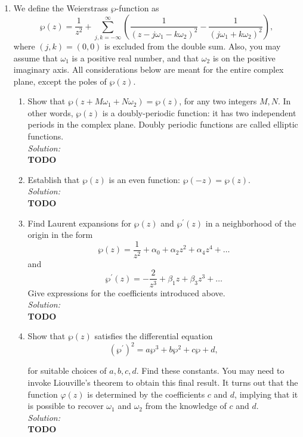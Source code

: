 \documentclass[10pt]{amsart}
\theoremstyle{nonumberplain}
\begin{document}
\begin{enumerate}[label={\bf {\arabic*}:}]
\item We define the Weierstrass $\wp$-function as
$$
\wp(z)=\frac{1}{z^2}+\sum_{j, k=-\infty}^{\infty}\left(\frac{1}{\left(z-j \omega_1-k \omega_2\right)^2}-\frac{1}{\left(j \omega_1+k \omega_2\right)^2}\right),
$$
where $(j, k)=(0,0)$ is excluded from the double sum. Also, you may
assume that $\omega_1$ is a positive real number, and that $\omega_2$
is on the positive imaginary axis. All considerations below are meant
for the entire complex plane, except the poles of $\wp(z)$.
\begin{enumerate}
\item Show that $\wp\left(z+M \omega_1+N \omega_2\right)=\wp(z)$, for any two integers $M, N$. In other words, $\wp(z)$ is a doubly-periodic function: it has two independent periods in the complex plane. Doubly periodic functions are called elliptic functions. \\
\textit{Solution:} \\
\textbf{TODO} \\

\item Establish that $\wp(z)$ is an even function: $\wp(-z)=\wp(z)$. \\
\textit{Solution:} \\
\textbf{TODO} \\

\item Find Laurent expansions for $\wp(z)$ and $\wp^{\prime}(z)$ in a neighborhood of the origin in the form
$$ \wp(z)=\frac{1}{z^2}+\alpha_0+\alpha_2 z^2+\alpha_4 z^4+\ldots $$
and
$$ \wp^{\prime}(z)=-\frac{2}{z^3}+\beta_1 z+\beta_3 z^3+\ldots $$
Give expressions for the coefficients introduced above. \\
\textit{Solution:} \\
\textbf{TODO} \\

\item Show that $\wp(z)$ satisfies the differential equation
$$ \left(\wp^{\prime}\right)^2=a \wp^3+b \wp^2+c \wp+d, $$

for suitable choices of $a, b, c, d$. Find these constants. You may need to invoke Liouville's theorem to obtain this final result. It turns out that the function $\varphi(z)$ is determined by the coefficients $c$ and $d$, implying that it is possible to recover $\omega_1$ and $\omega_2$ from the knowledge of $c$ and $d$. \\
\textit{Solution:} \\
\textbf{TODO} \\



\end{enumerate}
\end{enumerate}
\end{document}

